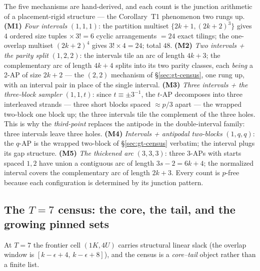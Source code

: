 \documentclass[11pt,a4paper]{article}
\numberwithin{equation}{section}
\theoremstyle{plain}
\theoremstyle{definition}
\theoremstyle{remark}
\begin{document}
The five mechanisms are hand-derived, and each count is the junction
arithmetic of a placement-rigid structure --- the Corollary~T1
phenomenon two rungs up. \textbf{(M1)} \emph{Four intervals} $(1,1,1)$:
the partition multiset $\{2k+1,(2k+2)^3\}$ gives $4$ ordered size
tuples $\times\,3!=6$ cyclic arrangements $=24$ exact tilings; the
one-overlap multiset $(2k+2)^4$ gives $3!\times4=24$; total $48$.
\textbf{(M2)} \emph{Two intervals + the parity split} $(1,2,2)$: the
intervals tile an arc of length $4k+3$; the complementary arc of length
$4k+4$ splits into its two parity classes, each \emph{being} a 2-AP of
size $2k+2$ --- the $(2,2)$ mechanism of \S\ref{sec:gt-census}, one rung
up, with an interval pair in place of the single interval.
\textbf{(M3)} \emph{Three intervals + the three-block sampler}
$(1,1,t)$: since $t\equiv\pm3^{-1}$, the $t$-AP decomposes into three
interleaved strands --- three short blocks spaced $\approx p/3$ apart
--- the wrapped two-block one block up; the three intervals tile the
complement of the three holes. This is why the \emph{third-point}
replaces the antipode in the double-interval family: three intervals
leave three holes. \textbf{(M4)} \emph{Intervals + antipodal
two-blocks} $(1,q,q)$: the $q$-AP is the wrapped two-block of
\S\ref{sec:gt-census} verbatim; the interval plugs its gap structure.
\textbf{(M5)} \emph{The thickened arc} $(3,3,3)$: three 3-APs with
starts spaced $1,2$ have union a contiguous arc of length $3s-2=6k+4$;
the normalized interval covers the complementary arc of length $2k+3$.
Every count is $p$-free because each configuration is determined by its
junction pattern.

\subsection{The \texorpdfstring{$T=7$}{T=7} census: the core, the tail, and the growing pinned sets}

At $T=7$ the frontier cell $(1K,4U)$ carries structural linear slack
(the overlap window is $[k-\epsilon+4,\,k-\epsilon+8]$), and the census
is a \emph{core--tail} object rather than a finite list.
\end{document}
